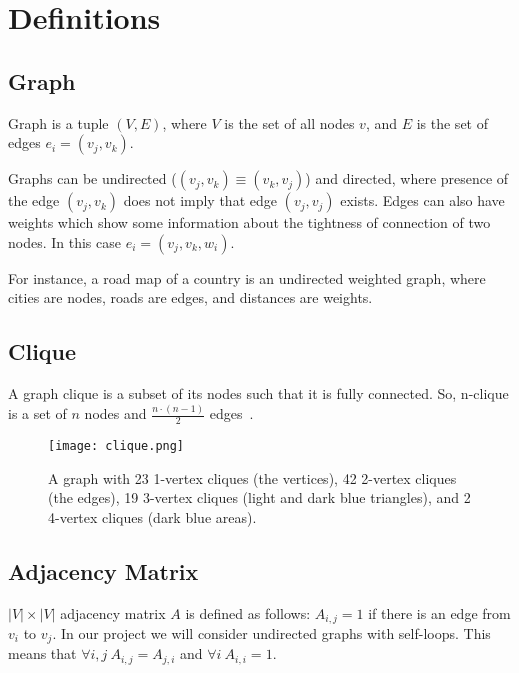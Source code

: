 \section{Definitions}

\subsection*{Graph}

Graph is a tuple $\left( V, E \right)$, where $V$ is the set of all nodes $v$, and $E$ is the set of edges $e_i = (v_j, v_k)$.

Graphs can be undirected ($(v_j, v_k) \equiv (v_k, v_j)$) and directed, where presence of the edge $(v_j, v_k)$ does not imply that edge $(v_j, v_j)$ exists.
Edges can also have weights which show some information about the tightness of connection of two nodes.
In this case $e_i = (v_j, v_k, w_i)$.

For instance, a road map of a country is an undirected weighted graph, where cities are nodes, roads are edges, and distances are weights.


\subsection*{Clique}

A graph clique is a subset of its nodes such that it is fully connected.
So, n-clique is a set of $n$ nodes and $\frac{n \cdot (n - 1)}{2}$ edges~\cite{wiki_clique}.

\begin{figure}[h]
	\centering
	\texttt{[image: clique.png]}
	\caption{A graph with 23 1-vertex cliques (the vertices), 42 2-vertex cliques (the edges), 19 3-vertex cliques (light and dark blue triangles), and 2 4-vertex cliques (dark blue areas).}
\end{figure}


\subsection*{Adjacency Matrix}

$\lvert V \rvert \times \lvert V \rvert$ adjacency matrix $A$ is defined as follows: $A_{i, j} = 1$ if there is an edge from $v_i$ to $v_j$.
In our project we will consider undirected graphs with self-loops.
This means that $\forall i, j\ A_{i, j} = A_{j, i}$ and $\forall i\ A_{i, i} = 1$.


